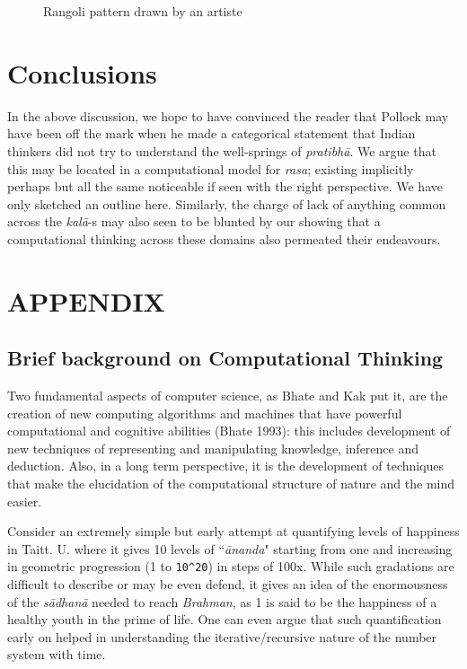 \begin{figure}[H]
\centering
\caption{Rangoli pattern drawn by an artiste}
\end{figure}

\section{Conclusions}\label{chap7-sec6}

In the above discussion, we hope to have convinced the reader that Pollock may have been off the mark when he made a categorical statement that Indian thinkers did not try to understand the well-springs of \textsl{pratibhā}. We argue that this may be located in a computational model for \textsl{rasa}; existing implicitly perhaps but all the same noticeable if seen with the right perspective. We have only sketched an outline here. Similarly, the charge of lack of anything common across the \textsl{kalā}-s may also seen to be blunted by our showing that a computational thinking across these domains also permeated their endeavours.

\appendix
\section{APPENDIX}\label{chap7-app1}


\subsection*{Brief background on Computational Thinking}

Two fundamental aspects of computer science, as Bhate and Kak put it, are the creation of new computing algorithms and machines that have powerful computational and cognitive abilities (Bhate 1993): this includes development of new techniques of representing and manipulating knowledge, inference and deduction. Also, in a long term perspective, it is the development of techniques that make the elucidation of the computational structure of nature and the mind easier.

Consider an extremely simple but early attempt at quantifying levels of happiness in Taitt. U. where it gives 10 levels of “\textsl{ānanda}" starting from one and increasing in geometric progression (1 to \verb|10^20|) in steps of 100x. While such gradations are difficult to describe or may be even defend, it gives an idea of the enormousness of the \textsl{sādhanā} needed to reach \textsl{Brahman}, as 1 is said to be the happiness of a healthy youth in the prime of life. One can even argue that such quantification early on helped in understanding the iterative/recursive nature of the number system with time.

